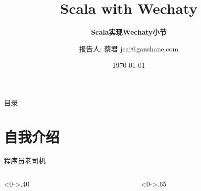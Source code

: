 \documentclass[10pt,aspectratio=43,mathserif,table]{beamer}
\title{Scala with Wechaty}
\subtitle{\fontsize{9pt}{14pt}\textbf{Scala实现Wechaty小节}}
\author{报告人: 蔡君 \newline \newline jcai@ganshane.com}
\institute{\fontsize{8pt}{14pt}https://github.com/jcai}
\date{\today}
\begin{document}

\frame{\titlepage}

\section[目录]{}   %
\begin{frame}{目录}
\tableofcontents
\end{frame}

\section{自我介绍}  %
\begin{frame}{程序员老司机}
\begin{columns}[T] %
\begin{column}<0->{.40\textwidth}
	\begin{figure}[thpb]
		\centering
		\label{fig:campus}
	\end{figure}
\end{column}%
\hfill%
\begin{column}<0->{.65\textwidth}
  \begin{itemize}

\end{itemize}
\end{column}
\end{columns}
\end{frame}
\end{document}
